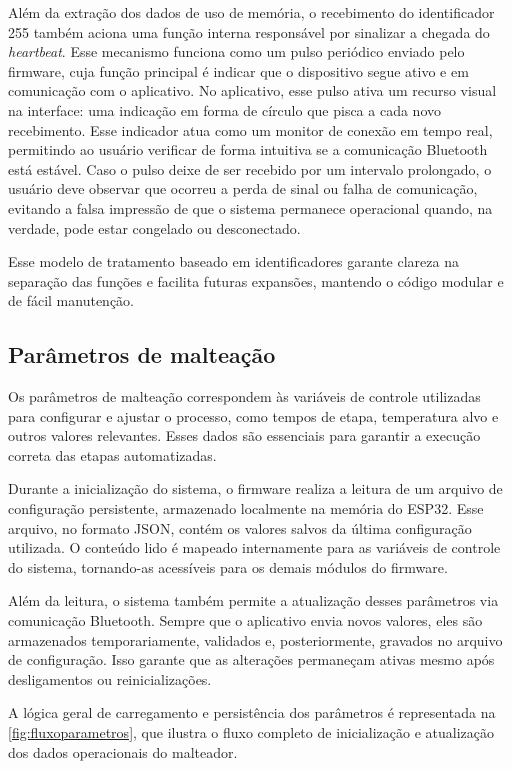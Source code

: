 Além da extração dos dados de uso de memória, o recebimento do identificador 255 também aciona uma função interna responsável por sinalizar a chegada do \textit{heartbeat}. Esse mecanismo funciona como um pulso periódico enviado pelo firmware, cuja função principal é indicar que o dispositivo segue ativo e em comunicação com o aplicativo. No aplicativo, esse pulso ativa um recurso visual na interface: uma indicação em forma de círculo que pisca a cada novo recebimento. Esse indicador atua como um monitor de conexão em tempo real, permitindo ao usuário verificar de forma intuitiva se a comunicação Bluetooth está estável. Caso o pulso deixe de ser recebido por um intervalo prolongado, o usuário deve observar que ocorreu a perda de sinal ou falha de comunicação, evitando a falsa impressão de que o sistema permanece operacional quando, na verdade, pode estar congelado ou desconectado.

Esse modelo de tratamento baseado em identificadores garante clareza na separação das funções e facilita futuras expansões, mantendo o código modular e de fácil manutenção.


\subsection{Parâmetros de malteação}

Os parâmetros de malteação correspondem às variáveis de controle utilizadas para configurar e ajustar o processo, como tempos de etapa, temperatura alvo e outros valores relevantes. Esses dados são essenciais para garantir a execução correta das etapas automatizadas.

Durante a inicialização do sistema, o firmware realiza a leitura de um arquivo de configuração persistente, armazenado localmente na memória do ESP32. Esse arquivo, no formato JSON, contém os valores salvos da última configuração utilizada. O conteúdo lido é mapeado internamente para as variáveis de controle do sistema, tornando-as acessíveis para os demais módulos do firmware.

Além da leitura, o sistema também permite a atualização desses parâmetros via comunicação Bluetooth. Sempre que o aplicativo envia novos valores, eles são armazenados temporariamente, validados e, posteriormente, gravados no arquivo de configuração. Isso garante que as alterações permaneçam ativas mesmo após desligamentos ou reinicializações.

A lógica geral de carregamento e persistência dos parâmetros é representada na \autoref{fig:fluxoparametros}, que ilustra o fluxo completo de inicialização e atualização dos dados operacionais do malteador.

